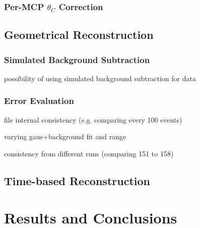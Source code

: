 \subsubsection{Per-MCP $\theta_{C}$ Correction}

\subsection{Geometrical Reconstruction}

\subsubsection{Simulated Background Subtraction}
possibility of using simulated background subtraction for data


\subsubsection{Error Evaluation}
file internal consistency (e.g. comparing every 100 events)

varying gaus+background fit and range

consistency from different runs (comparing 151 to 158)

\subsection{Time-based Reconstruction}

\section{Results and Conclusions}